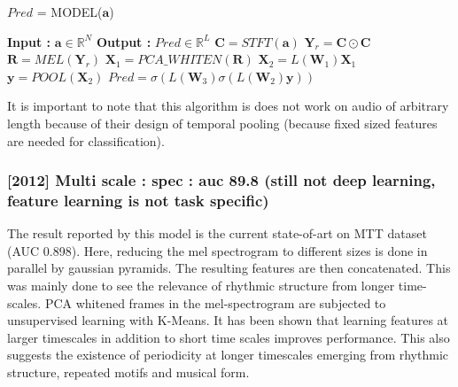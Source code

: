 \begin{algorithm}
  \caption{$Pred$ = MODEL($\textbf{a}$) }\label{Temporal Pooling}
  \begin{algorithmic}[1]
    \Statex \textbf{Input :} $\textbf{a} \in \mathbb{R}^{N}$
    \Statex \textbf{Output :} $Pred \in \mathbb{R}^{L}$ 
    \State $\textbf{C} = STFT(\textbf{a})$ 
    \State $\textbf{Y}_{r} = \textbf{C} \odot \textbf{C}$ 
    \State $\textbf{R} = MEL(\textbf{Y}_{r})$ 
    \State $\textbf{X}_{1} = PCA\_WHITEN(\textbf{R})$ 
    \State $\textbf{X}_{2} = L(\textbf{W}_{1})\textbf{X}_{1}$  
    \State $\textbf{y} = POOL(\textbf{X}_{2})$ 
    \State $Pred = \sigma(L(\textbf{W}_{3})\sigma(L(\textbf{W}_{2})\textbf{y}))$ 
  \end{algorithmic}
\end{algorithm}
\noindent It is important to note that this algorithm is does not work on audio of arbitrary length because of their design of temporal pooling (because fixed sized features are needed for classification).

\subsubsection{[2012] Multi scale : spec : auc 89.8 (still not deep learning, feature learning is not task specific)}
The result reported by this model is the current state-of-art on MTT dataset (AUC 0.898). Here, reducing the mel spectrogram to different sizes is done in parallel by \gls{gaussian pyramids}. The resulting features are then concatenated. This was mainly done to see the relevance of rhythmic structure from longer time-scales. PCA whitened frames in the mel-spectrogram are subjected to unsupervised learning with K-Means. It has been shown that learning features at larger timescales in addition to short time scales improves performance. This also suggests the existence of periodicity at longer timescales emerging from rhythmic structure, repeated motifs and musical form.  


